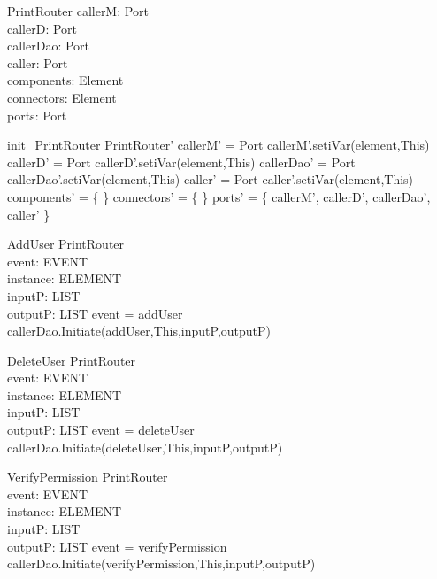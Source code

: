 \begin{schema}{PrintRouter}
callerM:  Port \\
callerD:  Port \\
callerDao: Port \\
caller:  Port \\
components: \pset Element \\
connectors: \pset Element \\
ports: \pset Port
\end{schema}


\begin{zed}
init\_PrintRouter \sdef \lsch PrintRouter'
                  \bbar callerM' = \new Port
                  \land callerM'.setiVar(element,This)
                  \land callerD' = \new Port
                  \land callerD'.setiVar(element,This)
                  \land callerDao' = \new Port
                  \land callerDao'.setiVar(element,This)
                  \land caller' = \new Port
                  \land caller'.setiVar(element,This)
                  \land components' = \{ \}
                  \land connectors' = \{ \}
                  \land ports' = \{ callerM', callerD', callerDao', caller' \}  \rsch
                  \end{zed}


\begin{schema}{AddUser}
\Delta PrintRouter \\
event: EVENT \\
instance: ELEMENT \\
inputP: LIST \\
outputP: LIST
\where event = addUser \\
callerDao.Initiate(addUser,This,inputP,outputP)
\end{schema}

\begin{schema}{DeleteUser}
\Delta PrintRouter \\
event: EVENT \\
instance: ELEMENT \\
inputP: LIST \\
outputP: LIST
\where event = deleteUser \\
callerDao.Initiate(deleteUser,This,inputP,outputP)
\end{schema}


\begin{schema}{VerifyPermission}
\Delta PrintRouter \\
event: EVENT \\
instance: ELEMENT \\
inputP: LIST \\
outputP: LIST
\where event = verifyPermission \\
callerDao.Initiate(verifyPermission,This,inputP,outputP)
\end{schema}


